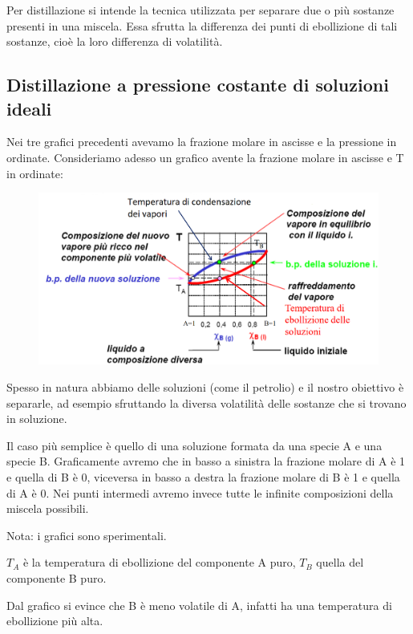 Per distillazione si intende la tecnica utilizzata per separare due o più sostanze presenti in una miscela. Essa sfrutta la differenza dei punti di ebollizione di tali sostanze, cioè la loro differenza di volatilità.

\vspace{-0.3cm}\subsection{Distillazione a pressione costante di soluzioni ideali}
Nei tre grafici precedenti avevamo la frazione molare in ascisse e la pressione in ordinate. Consideriamo adesso un grafico avente la frazione molare in ascisse e T in ordinate:

\vspace{-0.5cm}\begin{figure}[H]
    \centering
    \includegraphics[width=14.3cm]{immagini/distillazione_ideale.png}
\end{figure}

Spesso in natura abbiamo delle soluzioni (come il petrolio) e il nostro obiettivo è separarle, ad esempio sfruttando la diversa volatilità delle sostanze che si trovano in soluzione.

Il caso più semplice è quello di una soluzione formata da una specie A e una specie B. Graficamente avremo che in basso a sinistra la frazione molare di A è 1 e quella di B è 0, viceversa in basso a destra la frazione molare di B è 1 e quella di A è 0. Nei punti intermedi avremo invece tutte le infinite composizioni della miscela possibili.

Nota: i grafici sono sperimentali.

$T_A$ è la temperatura di ebollizione del componente A puro, $T_B$ quella del componente B puro.

Dal grafico si evince che B è meno volatile di A, infatti ha una temperatura di ebollizione più alta.


